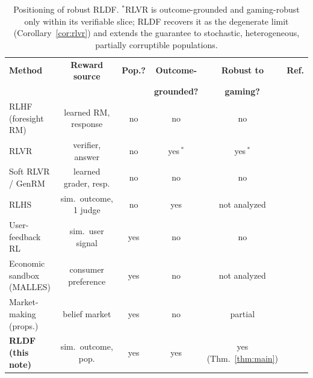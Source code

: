 \documentclass[11pt]{article}
\theoremstyle{plain}
\theoremstyle{definition}
\theoremstyle{remark}
\begin{document}
\begin{table}[h]
\centering
\small
\renewcommand{\arraystretch}{1.25}
\begin{tabular}{@{}lccccl@{}}
\toprule
\textbf{Method} & \textbf{Reward source} & \textbf{Pop.?} & \textbf{Outcome-} & \textbf{Robust to} & \textbf{Ref.}\\
 & & & \textbf{grounded?} & \textbf{gaming?} & \\
\midrule
RLHF (foresight RM)        & learned RM, response  & no  & no  & no            & \cite{dpo}\\
RLVR                       & verifier, answer      & no  & yes\,$^\ast$ & yes\,$^\ast$ & \cite{deepseekr1,tulu3}\\
Soft RLVR / GenRM          & learned grader, resp. & no  & no  & no            & \cite{crossingbridge,rlmt}\\
RLHS                       & sim.\ outcome, 1 judge& no  & yes & not analyzed  & \cite{rlhs}\\
User-feedback RL           & sim.\ user signal     & yes & no  & no            & \cite{williams}\\
Economic sandbox (MALLES)  & consumer preference   & yes & no  & not analyzed  & \cite{malles}\\
Market-making (props.)     & belief market         & yes & no  & partial       & \cite{marketmaking}\\
\textbf{RLDF (this note)}  & sim.\ outcome, pop.   & yes & yes & yes (Thm.~\ref{thm:main}) & \\
\bottomrule
\end{tabular}
\caption{Positioning of robust RLDF. $^\ast$RLVR is outcome-grounded and gaming-robust only
within its verifiable slice; RLDF recovers it as the degenerate limit
(Corollary~\ref{cor:rlvr}) and extends the guarantee to stochastic, heterogeneous, partially
corruptible populations.}
\label{tab:position}
\end{table}
\end{document}
